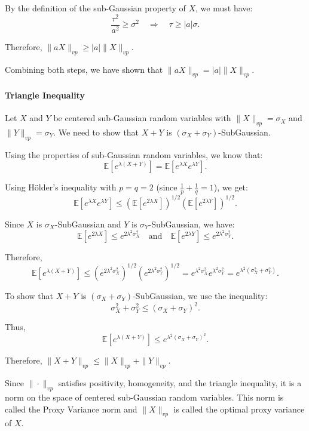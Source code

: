 \documentclass[a4 paper]{article}
\numberwithin{equation}{section}
\theoremstyle{boldStyle}
\theoremstyle{boldBlueStyle}
\theoremstyle{boldPurpleStyle}
\theoremstyle{boldRedStyle}
\begin{document}
\begin{enumerate}
By the definition of the sub-Gaussian property of \(X\), we must have:
\[
\frac{\tau^2}{a^2} \geq \sigma^2 \quad \Rightarrow \quad \tau \geq |a| \sigma.
\]

Therefore, $\|aX\|_{vp} \geq |a| \|X\|_{vp}$.

Combining both steps, we have shown that \(\|aX\|_{vp} = |a| \|X\|_{vp}\).



\paragraph{Triangle Inequality}
Let \(X\) and \(Y\) be centered sub-Gaussian random variables with \(\|X\|_{vp} = \sigma_X\) and \(\|Y\|_{vp} = \sigma_Y\). We need to show that \(X + Y\) is \((\sigma_X + \sigma_Y)\)-SubGaussian.

Using the properties of sub-Gaussian random variables, we know that:
\[
\mathbb{E}\left[e^{\lambda (X + Y)}\right] = \mathbb{E}\left[e^{\lambda X} e^{\lambda Y}\right].
\]

Using Hölder's inequality with \(p = q = 2\) (since \(\frac{1}{p} + \frac{1}{q} = 1\)), we get:
\[
\mathbb{E}\left[e^{\lambda X} e^{\lambda Y}\right] \leq \left(\mathbb{E}\left[e^{2\lambda X}\right]\right)^{1/2} \left(\mathbb{E}\left[e^{2\lambda Y}\right]\right)^{1/2}.
\]

Since \(X\) is \(\sigma_X\)-SubGaussian and \(Y\) is \(\sigma_Y\)-SubGaussian, we have:
\[
\mathbb{E}\left[e^{2\lambda X}\right] \leq e^{2\lambda^2 \sigma_X^2} \quad \text{and} \quad \mathbb{E}\left[e^{2\lambda Y}\right] \leq e^{2\lambda^2 \sigma_Y^2}.
\]

Therefore,
\[
\mathbb{E}\left[e^{\lambda (X + Y)}\right] \leq \left(e^{2\lambda^2 \sigma_X^2}\right)^{1/2} \left(e^{2\lambda^2 \sigma_Y^2}\right)^{1/2} = e^{\lambda^2 \sigma_X^2} e^{\lambda^2 \sigma_Y^2} = e^{\lambda^2 (\sigma_X^2 + \sigma_Y^2)}.
\]

To show that \(X + Y\) is \((\sigma_X + \sigma_Y)\)-SubGaussian, we use the inequality:
\[
\sigma_X^2 + \sigma_Y^2 \leq (\sigma_X + \sigma_Y)^2.
\]

Thus,
\[
\mathbb{E}\left[e^{\lambda (X + Y)}\right] \leq e^{\lambda^2 (\sigma_X + \sigma_Y)^2}.
\]

Therefore, \(\|X + Y\|_{vp} \leq \|X\|_{vp} + \|Y\|_{vp}\).

Since \(\|\cdot\|_{vp}\) satisfies positivity, homogeneity, and the triangle inequality, it is a norm on the space of centered sub-Gaussian random variables. This norm is called the Proxy Variance norm and \(\|X\|_{vp}\) is called the optimal proxy variance of \(X\).










\end{enumerate}
\end{document}

